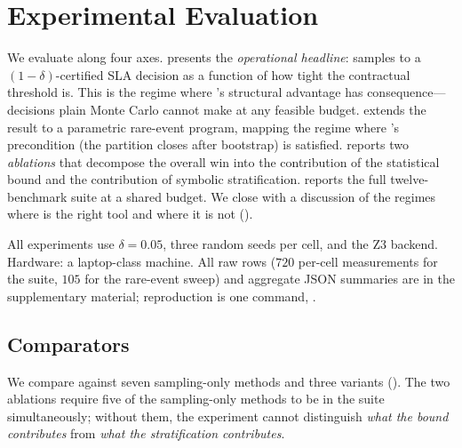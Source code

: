 \section{Experimental Evaluation}\label{sec:results}

We evaluate \toolname{} along four axes.
 presents the \emph{operational headline}:
samples to a $(1-\delta)$-certified SLA decision as a function of
how tight the contractual threshold is.  This is the regime where
\toolname{}'s structural advantage has consequence---decisions plain
Monte Carlo cannot make at any feasible budget.
 extends the result to a parametric
rare-event program, mapping the regime where \toolname{}'s
precondition (the partition closes after bootstrap) is satisfied.
 reports two \emph{ablations} that decompose
the overall win into the contribution of the statistical bound and
the contribution of symbolic stratification.
 reports the full twelve-benchmark suite at a
shared budget.
We close with a discussion of the regimes where \toolname{} is the
right tool and where it is not ().

All experiments use $\delta = 0.05$, three random seeds per cell, and
the Z3 backend.  Hardware: a laptop-class machine.  All raw rows
($720$ per-cell measurements for the suite, $105$ for the rare-event
sweep) and aggregate JSON summaries are in the supplementary
material; reproduction is one command,
.

\subsection{Comparators}\label{sec:comparators}

We compare against seven sampling-only methods and three \toolname{}
variants ().  The two ablations require five of
the sampling-only methods to be in the suite simultaneously; without
them, the experiment cannot distinguish \emph{what the bound
contributes} from \emph{what the stratification contributes}.

